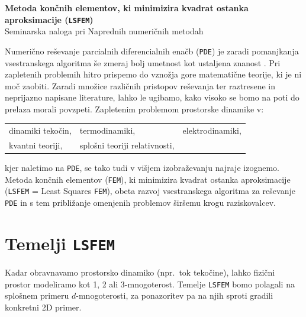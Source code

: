 \begin{center}
	\textbf{\LARGE{Metoda končnih elementov, ki minimizira kvadrat ostanka aproksimacije (\texttt{LSFEM})}}\\[0.25cm]
	\large{Seminarska naloga pri Naprednih numeričnih metodah}\\[0.7cm]
\end{center}

Numerično reševanje parcialnih diferencialnih enačb (\texttt{PDE}) je zaradi pomanjkanja vsestranskega algoritma še zmeraj bolj umetnost kot ustaljena znanost \cite{JiangB-LSFEM}. Pri zapletenih problemih hitro prispemo do vznožja gore matematične teorije, ki je ni moč zaobiti. Zaradi množice različnih pristopov reševanja ter raztresene in neprijazno napisane literature, lahko le ugibamo, kako visoko se bomo na poti do prelaza morali povzpeti. Zapletenim problemom prostorske dinamike v:
\begin{center}
	\begin{tabular}[h]{lll}
		\tabitem dinamiki tekočin,\hspace{1cm}	&	\tabitem termodinamiki,\hspace{2.5cm}	&	\tabitem elektrodinamiki,\\
		\tabitem kvantni teoriji,	&	\tabitem splošni teoriji relativnosti,&	\\
	\end{tabular}
\end{center}
kjer naletimo na \texttt{PDE}, se tako tudi v višjem izobraževanju najraje izognemo. Metoda končnih elementov (\texttt{FEM}), ki minimizira kvadrat ostanka aproksimacije (\texttt{LSFEM} = Least Squares \texttt{FEM}), obeta razvoj vsestranskega algoritma za reševanje \texttt{PDE} in s tem približanje omenjenih problemov širšemu krogu raziskovalcev.

\section{Temelji \texttt{LSFEM}}
Kadar obravnavamo prostorsko dinamiko (npr.\ tok tekočine), lahko fizični prostor modeliramo kot 1, 2 ali 3-mnogoterost. Temelje \texttt{LSFEM} bomo polagali na splošnem primeru $d$-mnogoterosti, za ponazoritev pa na njih sproti gradili konkretni 2D primer.

